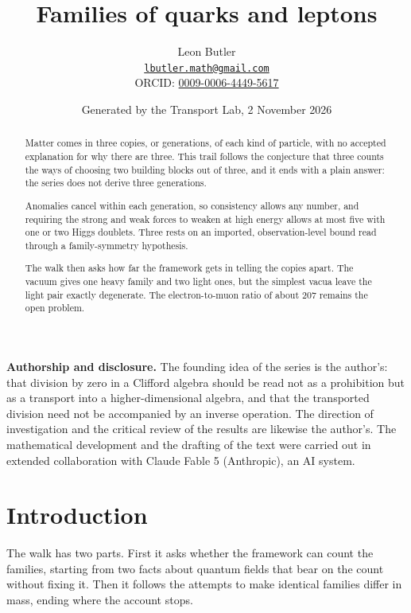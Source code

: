 \documentclass[11pt]{article}
\title{\bfseries Families of quarks and leptons}
\author{Leon Butler\\ \normalsize\href{mailto:lbutler.math@gmail.com}{\texttt{lbutler.math@gmail.com}}\\ \normalsize ORCID: \href{https://orcid.org/0009-0006-4449-5617}{0009-0006-4449-5617}}
\date{Generated by the Transport Lab, 2 November 2026}
\theoremstyle{definition}
\theoremstyle{plain}
\begin{document}
\maketitle
\begin{abstract}
\normalsize
Matter comes in three copies, or generations, of each kind of particle, with no accepted explanation for why there are three. This trail follows the conjecture that three counts the ways of choosing two building blocks out of three, and it ends with a plain answer: the series does not derive three generations.

Anomalies cancel within each generation, so consistency allows any number, and requiring the strong and weak forces to weaken at high energy allows at most five with one or two Higgs doublets. Three rests on an imported, observation-level bound read through a family-symmetry hypothesis.

The walk then asks how far the framework gets in telling the copies apart. The vacuum gives one heavy family and two light ones, but the simplest vacua leave the light pair exactly degenerate. The electron-to-muon ratio of about $207$ remains the open problem.
\end{abstract}
\newpage
\noindent \textbf{Authorship and disclosure. }The founding idea of the series is the author's: that division by zero in a Clifford algebra should be read not as a prohibition but as a transport into a higher-dimensional algebra, and that the transported division need not be accompanied by an inverse operation. The direction of investigation and the critical review of the results are likewise the author's. The mathematical development and the drafting of the text were carried out in extended collaboration with Claude Fable 5 (Anthropic), an AI system.

\noindent{}
\newpage

\section*{Introduction}
The walk has two parts. First it asks whether the framework can count the families, starting from two facts about quantum fields that bear on the count without fixing it. Then it follows the attempts to make identical families differ in mass, ending where the account stops.
\end{document}
